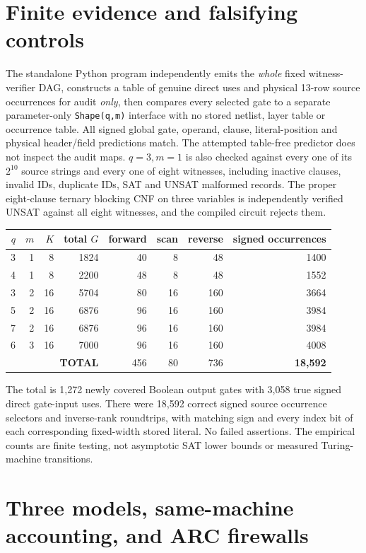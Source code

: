 \documentclass[11pt]{article}
\begin{document}
\section{Finite evidence and falsifying controls}
The standalone Python program independently emits the \emph{whole}
fixed witness-verifier DAG, constructs a table of genuine direct
uses and physical 13-row source occurrences for audit \emph{only},
then compares every selected gate to a separate parameter-only
\texttt{Shape(q,m)} interface with no stored netlist, layer table
or occurrence table. All signed global gate, operand, clause,
literal-position and physical header/field predictions match.
The attempted table-free predictor does not inspect the audit
maps. $q=3,m=1$ is also checked against every one of its $2^{10}$
source strings and every one of eight witnesses, including
inactive clauses, invalid IDs, duplicate IDs, SAT and UNSAT
malformed records. The proper eight-clause ternary blocking CNF
on three variables is independently verified UNSAT against all
eight witnesses, and the compiled circuit rejects them.

\begin{center}\small
\begin{tabular}{rrrrrrrr}
\toprule
$q$ & $m$ & $K$ & total $G$ & forward & scan & reverse & signed occurrences\\\midrule
3&1&8&1824&40&8&48&1400\\
4&1&8&2200&48&8&48&1552\\
3&2&16&5704&80&16&160&3664\\
5&2&16&6876&96&16&160&3984\\
7&2&16&6876&96&16&160&3984\\
6&3&16&7000&96&16&160&4008\\\midrule
\multicolumn{4}{r}{\textbf{TOTAL}}&456&80&736&\textbf{18,592}\\\bottomrule
\end{tabular}
\end{center}
The total is 1,272 newly covered Boolean output gates with
3,058 true signed direct gate-input uses. There were 18,592
correct signed source occurrence selectors and inverse-rank
roundtrips, with matching sign and every index bit of each
corresponding fixed-width stored literal. No failed assertions.
The empirical counts are finite testing, not asymptotic SAT
lower bounds or measured Turing-machine transitions.

\section{Three models, same-machine accounting, and ARC firewalls}
\end{document}
